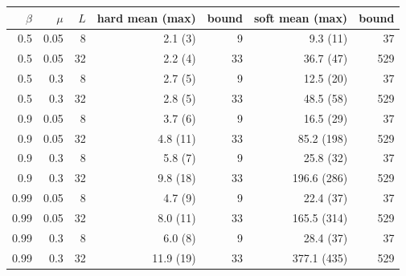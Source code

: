 \begin{tabular}{rrrrrrr}
\toprule
$\beta$ & $\mu$ & $L$ & hard mean (max) & bound & soft mean (max) & bound\\
\midrule
0.5 & 0.05 & 8 & 2.1 (3) & 9 & 9.3 (11) & 37\\
0.5 & 0.05 & 32 & 2.2 (4) & 33 & 36.7 (47) & 529\\
0.5 & 0.3 & 8 & 2.7 (5) & 9 & 12.5 (20) & 37\\
0.5 & 0.3 & 32 & 2.8 (5) & 33 & 48.5 (58) & 529\\
0.9 & 0.05 & 8 & 3.7 (6) & 9 & 16.5 (29) & 37\\
0.9 & 0.05 & 32 & 4.8 (11) & 33 & 85.2 (198) & 529\\
0.9 & 0.3 & 8 & 5.8 (7) & 9 & 25.8 (32) & 37\\
0.9 & 0.3 & 32 & 9.8 (18) & 33 & 196.6 (286) & 529\\
0.99 & 0.05 & 8 & 4.7 (9) & 9 & 22.4 (37) & 37\\
0.99 & 0.05 & 32 & 8.0 (11) & 33 & 165.5 (314) & 529\\
0.99 & 0.3 & 8 & 6.0 (8) & 9 & 28.4 (37) & 37\\
0.99 & 0.3 & 32 & 11.9 (19) & 33 & 377.1 (435) & 529\\
\bottomrule
\end{tabular}
